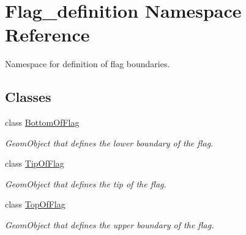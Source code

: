 \hypertarget{namespaceFlag__definition}{}\section{Flag\+\_\+definition Namespace Reference}
\label{namespaceFlag__definition}


Namespace for definition of flag boundaries.  


\subsection*{Classes}
\begin{DoxyCompactItemize}
\item 
class \hyperlink{classFlag__definition_1_1BottomOfFlag}{Bottom\+Of\+Flag}
\begin{DoxyCompactList}\small\item\em Geom\+Object that defines the lower boundary of the flag. \end{DoxyCompactList}\item 
class \hyperlink{classFlag__definition_1_1TipOfFlag}{Tip\+Of\+Flag}
\begin{DoxyCompactList}\small\item\em Geom\+Object that defines the tip of the flag. \end{DoxyCompactList}\item 
class \hyperlink{classFlag__definition_1_1TopOfFlag}{Top\+Of\+Flag}
\begin{DoxyCompactList}\small\item\em Geom\+Object that defines the upper boundary of the flag. \end{DoxyCompactList}\end{DoxyCompactItemize}
